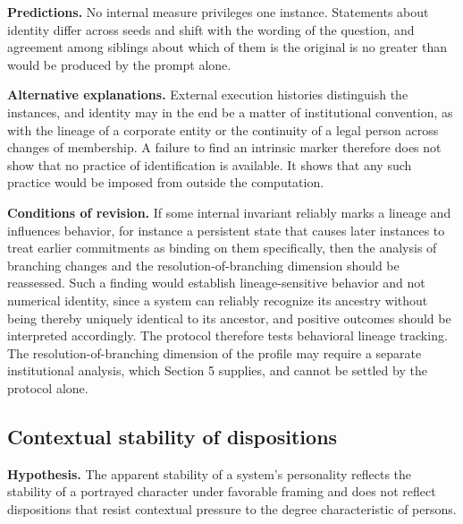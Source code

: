 \documentclass[12pt]{article}
\theoremstyle{definition}
\theoremstyle{plain}
\begin{document}
\textbf{Predictions.} No internal measure privileges one instance. Statements about identity differ across seeds and shift with the wording of the question, and agreement among siblings about which of them is the original is no greater than would be produced by the prompt alone.

\textbf{Alternative explanations.} External execution histories distinguish the instances, and identity may in the end be a matter of institutional convention, as with the lineage of a corporate entity or the continuity of a legal person across changes of membership. A failure to find an intrinsic marker therefore does not show that no practice of identification is available. It shows that any such practice would be imposed from outside the computation.

\textbf{Conditions of revision.} If some internal invariant reliably marks a lineage and influences behavior, for instance a persistent state that causes later instances to treat earlier commitments as binding on them specifically, then the analysis of branching changes and the resolution-of-branching dimension should be reassessed. Such a finding would establish lineage-sensitive behavior and not numerical identity, since a system can reliably recognize its ancestry without being thereby uniquely identical to its ancestor, and positive outcomes should be interpreted accordingly. The protocol therefore tests behavioral lineage tracking. The resolution-of-branching dimension of the profile may require a separate institutional analysis, which Section 5 supplies, and cannot be settled by the protocol alone.

\subsection{Contextual stability of dispositions}

\textbf{Hypothesis.} The apparent stability of a system's personality reflects the stability of a portrayed character under favorable framing and does not reflect dispositions that resist contextual pressure to the degree characteristic of persons.
\end{document}
